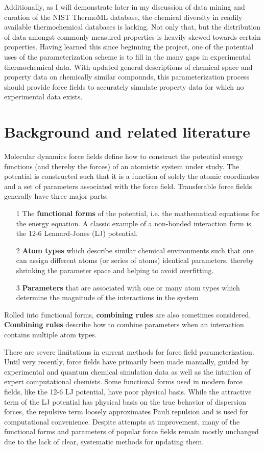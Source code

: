 \documentclass[rmp,nofootinbib,superscriptaddress,12pt,tightenlines,notitlepage]{revtex4-1}
\begin{document}
Additionally, as I will demonstrate later in my discussion of data mining and curation of the NIST ThermoML database,
the chemical diversity in readily available thermochemical databases is lacking. Not only that, but the distribution of data
amongst commonly measured properties is heavily skewed towards certain properties. Having learned this since beginning the
project, one of the potential uses of the parameterization scheme is to fill in the many gaps in experimental thermochemical 
data. With updated general descriptions of chemical space and property data on chemically similar compounds, this parameterization
process should provide force fields to accurately simulate property data for which no experimental data exists. 

\section{Background and related literature}
Molecular dynamics force fields define how to construct the potential energy functions (and thereby the forces) 
of an atomistic system under study. The potential is constructed such that it is a function of solely the atomic 
coordinates and a set of parameters associated with the force field. Transferable force fields generally have 
three major parts: 
  \begin{itemize}
   \item [1] The \textbf{functional forms} of the potential, i.e. the mathematical equations for the energy equation. A classic example of a non-bonded interaction form is the 12-6 Lennard-Jones (LJ) potential.   
   \item [2] \textbf{Atom types} which describe similar chemical environments such that one can assign different atoms (or series of atoms) identical parameters, thereby shrinking the parameter space and helping to avoid overfitting.
   \item [3] \textbf{Parameters} that are associated with one or many atom types which determine the magnitude of the interactions in the system 
  \end{itemize}
Rolled into functional forms, \textbf{combining rules} are also sometimes considered. \textbf{Combining rules} describe how to combine parameters 
when an interaction contains multiple atom types.

There are severe limitations in current methods for force field parameterization. Until very 
recently, force fields have primarily been made manually, guided by experimental and quantum chemical simulation 
data as well as the intuition of expert computational chemists.\cite{charmm1,charmm2,mm2,mmff,amber} Some functional 
forms used in modern force fields, like the 12-6 LJ potential, have poor physical basis. While the attractive term 
of the LJ potential has physical basis on the true behavior of dispersion forces, the repulsive term loosely 
approximates Pauli repulsion and is used for computational convenience. Despite attempts at improvement, many of 
the functional forms and parameters of popular force fields remain mostly unchanged due to the lack of clear, 
systematic methods for updating them.\cite{unchanged}
\end{document}
